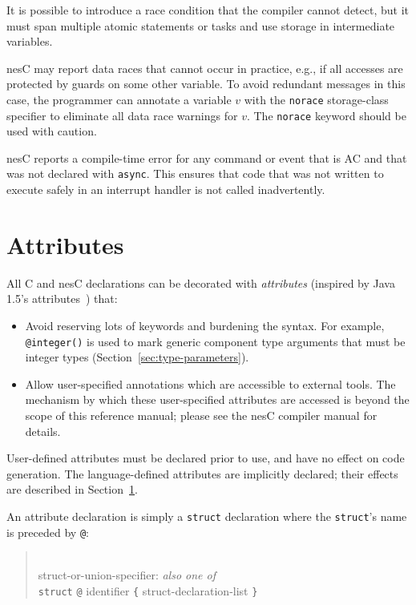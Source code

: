 \documentclass[11pt,letterpaper]{article}
\newcommand{\kw}[1]{{\tt #1}}
\newcommand{\code}[1]{{\tt #1}}
\newcommand{\nesc}{nesC\xspace}
\newcommand{\grammarshift}{\vspace*{-.7cm}}
\newcommand{\grammarindent}{\hspace*{2cm}\= \\ \kill}
\begin{document}
It is possible to introduce a race condition that the compiler cannot
detect, but it must span multiple atomic statements or tasks and use storage
in intermediate variables.

\nesc may report data races that cannot occur in practice, e.g., if all
accesses are protected by guards on some other variable. To avoid redundant
messages in this case, the programmer can annotate a variable $v$ with the
\kw{norace} storage-class specifier to eliminate all data race warnings for
$v$. The \kw{norace} keyword should be used with caution.

\nesc reports a compile-time error for any command or event that is AC and
that was not declared with \kw{async}. This ensures that code that was not
written to execute safely in an interrupt handler is not called
inadvertently.

\section{Attributes}
\label{sec:attributes}

All C and \nesc declarations can be decorated with \emph{attributes}
(inspired by Java 1.5's attributes~\cite{java-attributes}) that:
\begin{itemize}
\item Avoid reserving lots of keywords and burdening the syntax. For
 example, \code{@integer()} is used to mark generic component type arguments
 that must be integer types (Section~\ref{sec:type-parameters}).

\item Allow user-specified annotations which are accessible to external tools.
The mechanism by which these user-specified attributes are accessed is
beyond the scope of this reference manual; please see the \nesc compiler
manual for details.
\end{itemize}

User-defined attributes must be declared prior to use, and have no effect
on code generation. The language-defined attributes are implicitly
declared; their effects are described in Section~\ref{sec:attributes}.

An attribute declaration is simply a \kw{struct} declaration where the
\kw{struct}'s name is preceded by \code{@}:
\begin{quote} \grammarshift
\em \begin{tabbing}
\grammarindent
struct-or-union-specifier: \emph{also one of}\\
\>	\kw{struct} \kw{@} identifier \kw{\{} struct-declaration-list \kw{\}}\\
\end{tabbing}
\end{quote}
\end{document}
